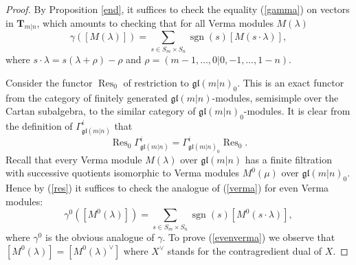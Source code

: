 \documentclass[12pt,oneside,english]{amsart}
\numberwithin{equation}{section}
\numberwithin{figure}{section}
\theoremstyle{plain}
\theoremstyle{plain}
\theoremstyle{remark}
\theoremstyle{definition}
\theoremstyle{plain}
\theoremstyle{remark}
\theoremstyle{definition}
\theoremstyle{plain}
\theoremstyle{plain}
\theoremstyle{definition}
\newcommand{\bT}{\mathbf{T}}
\begin{document}
    \begin{proof} By Proposition \ref{end},
      it suffices to check the equality (\ref{gamma}) on vectors in $\bT_{m|n}$, which amounts to checking that for all Verma modules $M(\lambda)$
\begin{equation}\label{verma}
  \gamma([M(\lambda)])=\sum_{s\in S_m\times S_n}\operatorname{sgn}(s) [M(s\cdot\lambda)],
  \end{equation}
      where $s\cdot \lambda=s(\lambda+\rho)-\rho$ and $\rho=(m-1,\dots,0|0,-1,\dots,1-n)$.

      Consider the functor $\operatorname{Res}_0$ of restriction to $\mathfrak{gl}(m|n)_0$. This is an exact functor from the category
      of finitely generated  $\mathfrak{gl}(m|n)$-modules, semisimple over the Cartan subalgebra, to the similar category of $\mathfrak{gl}(m|n)_0$-modules. It is
      clear from the definition of $\Gamma^i_{\mathfrak{gl}(m|n)}$ that
      \begin{equation}\label{res}
       \operatorname{Res}_0\Gamma^i_{\mathfrak{gl}(m|n)}=\Gamma^i_{\mathfrak{gl}(m|n)_0}\operatorname{Res}_0.
        \end{equation}
        Recall that every Verma module $M(\lambda)$ over $\mathfrak{gl}(m|n)$ has a  finite filtration with successive quotients isomorphic to Verma modules
        $M^0(\mu)$ over $\mathfrak{gl}(m|n)_0$. Hence by (\ref{res}) it
        suffices to check the analogue of (\ref{verma}) for even Verma modules:
        \begin{equation}\label{evenverma}
       \gamma^0([M^0(\lambda)])=\sum_{s\in S_m\times S_n}\operatorname{sgn}(s) [M^0(s\cdot\lambda)],
       \end{equation}
       where $\gamma^0$ is the obvious analogue of $\gamma$. To prove
       (\ref{evenverma}) we observe that
       $[M^0(\lambda)]=[M^0(\lambda)^\vee]$ where $X^\vee$ stands for
       the contragredient dual of $X$.


\end{proof}
\end{document}
